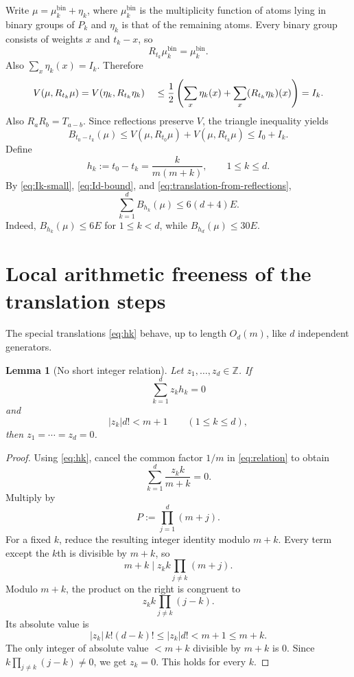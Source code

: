 \documentclass[11pt]{article}
\newtheorem{lemma}[theorem]{Lemma}
\theoremstyle{definition}
\newcommand{\Z}{\mathbb{Z}}
\newcommand{\1}{\mathbf{1}}
\begin{document}
Write $\mu=\mu_k^{\mathrm{bin}}+\eta_k$, where $\mu_k^{\mathrm{bin}}$ is the multiplicity function of atoms lying in binary groups of $P_k$ and $\eta_k$ is that of the remaining atoms.  Every binary group consists of weights $x$ and $t_k-x$, so
\[
  R_{t_k}\mu_k^{\mathrm{bin}}=\mu_k^{\mathrm{bin}}.
\]
Also $\sum_x\eta_k(x)=I_k$.  Therefore
\begin{align}
  V(\mu,R_{t_k}\mu)
  &=V(\eta_k,R_{t_k}\eta_k)\notag\
  &\le\frac12\left(\sum_x\eta_k(x)+\sum_x(R_{t_k}\eta_k)(x)\right)
  =I_k.\label{eq:reflection-defect}
\end{align}
Also $R_aR_b=T_{a-b}$.  Since reflections preserve $V$, the triangle inequality yields
\begin{equation}\label{eq:translation-from-reflections}
  B_{t_0-t_k}(\mu)
  \le V(\mu,R_{t_0}\mu)+V(\mu,R_{t_k}\mu)
  \le I_0+I_k.
\end{equation}
Define
\begin{equation}\label{eq:hk}
  h_k:=t_0-t_k=\frac{k}{m(m+k)},\qquad 1\le k\le d.
\end{equation}
By \eqref{eq:Ik-small}, \eqref{eq:Id-bound}, and \eqref{eq:translation-from-reflections},
\begin{equation}\label{eq:sum-defect-upper}
  \sum_{k=1}^d B_{h_k}(\mu)
  \le 6(d+4)E.
\end{equation}
Indeed, $B_{h_k}(\mu)\le6E$ for $1\le k<d$, while $B_{h_d}(\mu)\le30E$.

\section{Local arithmetic freeness of the translation steps}

The special translations \eqref{eq:hk} behave, up to length $O_d(m)$, like $d$ independent generators.

\begin{lemma}[No short integer relation]\label{lem:no-short-relation}
Let $z_1,\ldots,z_d\in\Z$.  If
\begin{equation}\label{eq:relation}
  \sum_{k=1}^d z_kh_k=0
\end{equation}
and
\begin{equation}\label{eq:shortness}
  |z_k|d!<m+1\qquad(1\le k\le d),
\end{equation}
then $z_1=\cdots=z_d=0$.
\end{lemma}

\begin{proof}
Using \eqref{eq:hk}, cancel the common factor $1/m$ in \eqref{eq:relation} to obtain
\[
  \sum_{k=1}^d\frac{z_kk}{m+k}=0.
\]
Multiply by
\[
  P:=\prod_{j=1}^d(m+j).
\]
For a fixed $k$, reduce the resulting integer identity modulo $m+k$.  Every term except the $k$th is divisible by $m+k$, so
\[
  m+k\mid z_kk\prod_{j\ne k}(m+j).
\]
Modulo $m+k$, the product on the right is congruent to
\[
  z_kk\prod_{j\ne k}(j-k).
\]
Its absolute value is
\[
  |z_k|\,k!(d-k)!\le |z_k|d!<m+1\le m+k.
\]
The only integer of absolute value $<m+k$ divisible by $m+k$ is $0$.  Since $k\prod_{j\ne k}(j-k)\ne0$, we get $z_k=0$.  This holds for every $k$.
\end{proof}
\end{document}
